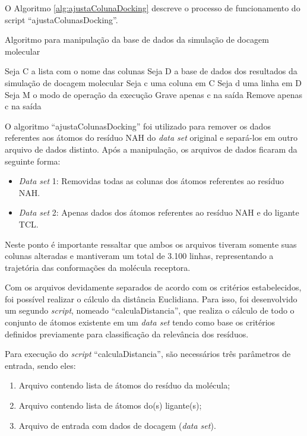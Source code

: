 O Algoritmo \ref{alg:ajustaColunaDocking} descreve o processo de funcionamento do script ``ajustaColunasDocking''.

\begin{algorithm}[H]
\caption{Algoritmo para manipulação da base de dados da simulação de docagem molecular}
\label{alg:ajustaColunaDocking}
{\fontsize{10}{10}\selectfont
\begin{algorithmic}[1]
	\STATE Seja C a lista com o nome das colunas
	\STATE Seja D a base de dados dos resultados da simulação de docagem molecular
	\STATE Seja c uma coluna em C
	\STATE Seja d uma linha em D
	\STATE Seja M o modo de operação da execução
			\STATE Grave apenas c na saída
			\ENDFOR
		\ENDFOR
	\ENDIF
			\STATE Remove apenas c na saída
			\ENDFOR
		\ENDFOR
	\ENDIF
\end{algorithmic}
}
\end{algorithm}

O algoritmo ``ajustaColunasDocking'' foi utilizado para remover os dados referentes aos átomos do resíduo NAH do \emph{data set} original e separá-los em outro arquivo de dados distinto. Após a manipulação, os arquivos de dados ficaram da seguinte forma:
\begin{itemize}
	\item \emph{Data set} 1: Removidas todas as colunas dos átomos referentes ao resíduo NAH.
	\item \emph{Data set} 2: Apenas dados dos átomos referentes ao resíduo NAH e do ligante TCL.
\end{itemize}

Neste ponto é importante ressaltar que ambos os arquivos tiveram somente suas colunas alteradas e mantiveram um total de 3.100 linhas, representando a trajetória das conformações da molécula receptora.

Com os arquivos devidamente separados de acordo com os critérios estabelecidos, foi possível realizar o cálculo da distância Euclidiana. Para isso, foi desenvolvido um segundo \emph{script}, nomeado ``calculaDistancia'', que realiza o cálculo de todo o conjunto de átomos existente em um \emph{data set} tendo como base os critérios definidos previamente para classificação da relevância dos resíduos.

Para execução do \emph{script} ``calculaDistancia'', são necessários três parâmetros de entrada, sendo eles:
\begin{enumerate}
	\item Arquivo contendo lista de átomos do resíduo da molécula;
	\item Arquivo contendo lista de átomos do(s) ligante(s);
	\item Arquivo de entrada com dados de docagem (\emph{data set}).
\end{enumerate}

